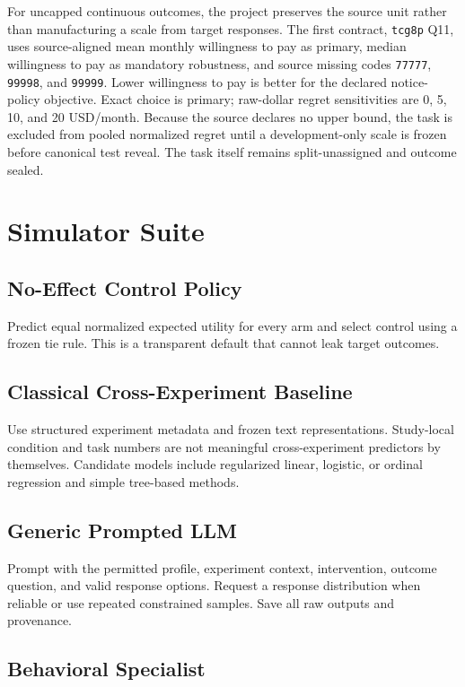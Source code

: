 \documentclass[11pt]{article}
\begin{document}
For uncapped continuous outcomes, the project preserves the source unit rather than manufacturing a scale from target responses. The first contract, \texttt{tcg8p} Q11, uses source-aligned mean monthly willingness to pay as primary, median willingness to pay as mandatory robustness, and source missing codes \texttt{77777}, \texttt{99998}, and \texttt{99999}. Lower willingness to pay is better for the declared notice-policy objective. Exact choice is primary; raw-dollar regret sensitivities are 0, 5, 10, and 20 USD/month. Because the source declares no upper bound, the task is excluded from pooled normalized regret until a development-only scale is frozen before canonical test reveal. The task itself remains split-unassigned and outcome sealed.

\section{Simulator Suite}

\subsection{No-Effect Control Policy}

Predict equal normalized expected utility for every arm and select control using a frozen tie rule. This is a transparent default that cannot leak target outcomes.

\subsection{Classical Cross-Experiment Baseline}

Use structured experiment metadata and frozen text representations. Study-local condition and task numbers are not meaningful cross-experiment predictors by themselves. Candidate models include regularized linear, logistic, or ordinal regression and simple tree-based methods.

\subsection{Generic Prompted LLM}

Prompt with the permitted profile, experiment context, intervention, outcome question, and valid response options. Request a response distribution when reliable or use repeated constrained samples. Save all raw outputs and provenance.

\subsection{Behavioral Specialist}
\end{document}
